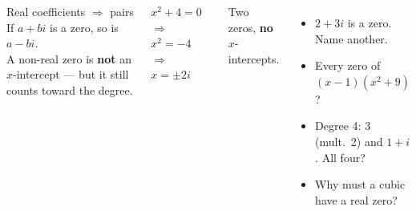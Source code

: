 \documentclass[aspectratio=169, 11pt]{beamer}
\begin{document}
\begin{frame}[t, plain]

  \begin{columns}[T]
      \begin{block}{Real coefficients \(\Rightarrow\) pairs}
        If \(a + bi\) is a zero, so is \(a - bi\).\\[3pt]
        A non-real zero is \textbf{not} an \(x\)-intercept --- but it still counts toward the
        degree.
      \end{block}

      \medskip
      \(x^2 + 4 = 0\) \(\Rightarrow\) \(x^2 = -4\) \(\Rightarrow\) \(x = \pm 2i\)

      \smallskip
      Two zeros, \textbf{no} \(x\)-intercepts.

      \begin{itemize}\setlength{\itemsep}{6pt}
        \item \(2 + 3i\) is a zero. Name another.
        \item Every zero of \((x - 1)(x^2 + 9)\)?
        \item Degree 4: 3 (mult.\ 2) and \(1 + i\). All four?
        \item Why must a cubic have a real zero?
      \end{itemize}
  \end{columns}
\end{frame}
\end{document}
